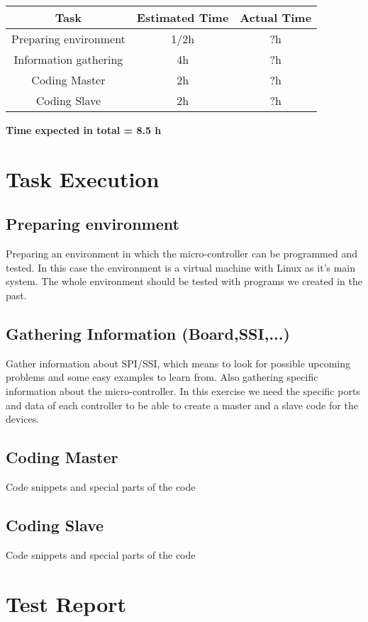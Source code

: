 \documentclass[11pt,a4paper]{article}
\begin{document}
\begin{table}[h]
\begin{tabular}{@{}|c|c|c|@{}}
\toprule
\textbf{Task}         & \textbf{Estimated Time} & \textbf{Actual Time} \\ \midrule
Preparing environment & 1/2h                    & ?h                   \\ \midrule
Information gathering & 4h                      & ?h                   \\ \midrule
Coding Master         & 2h                      & ?h                   \\ \midrule
Coding Slave          & 2h                      & ?h                   \\ \bottomrule
\end{tabular}
\end{table}

\bf Time expected in total = 8.5 h

\newpage

\section{Task Execution}
\subsection{Preparing environment}
Preparing an environment in which the micro-controller can be programmed and tested. In this case the environment is a virtual machine with Linux as it's main system.
The whole environment should be tested with programs we created in the past.

\subsection{Gathering Information (Board,SSI,...)}
Gather information about SPI/SSI, which means to look for possible upcoming problems and some easy examples to learn from. Also gathering specific information about the micro-controller. In this exercise we need the specific ports and data of each controller to be able to create a master and a slave code for the devices.

\subsection{Coding Master}
Code snippets and special parts of the code
\subsection{Coding Slave}
Code snippets and special parts of the code
\newpage

\section{Test Report}
\newpage



\end{document}
